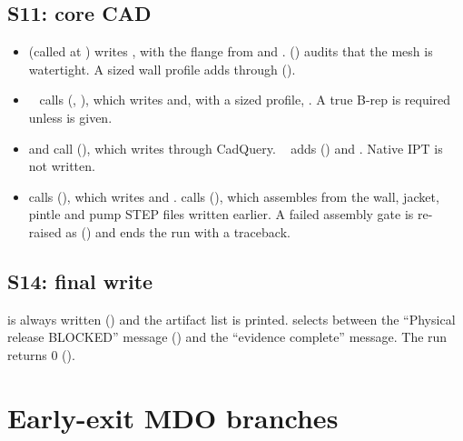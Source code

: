 \subsection{S11: core CAD}\label{sec:df-s11}
\begin{itemize}
  \item {} (called at ) writes , with the flange from  and .  () audits that the mesh is watertight. A sized wall profile adds  through  ().
  \item {}~ calls  (, ), which writes  and, with a sized profile, . A true B-rep is required unless  is given.
  \item {} and  call  (), which writes  through CadQuery. ~ adds  () and . Native IPT is not written.
  \item {} calls  (), which writes  and .  calls  (), which assembles  from the wall, jacket, pintle and pump STEP files written earlier. A failed assembly gate is re-raised as  () and ends the run with a traceback.
\end{itemize}

\subsection{S14: final write}\label{sec:df-s14final}
 is always written () and the artifact list is printed.  selects between the ``Physical release BLOCKED'' message () and the ``evidence complete'' message. The run returns 0 ().

\section{Early-exit MDO branches}\label{sec:df-mdo}


